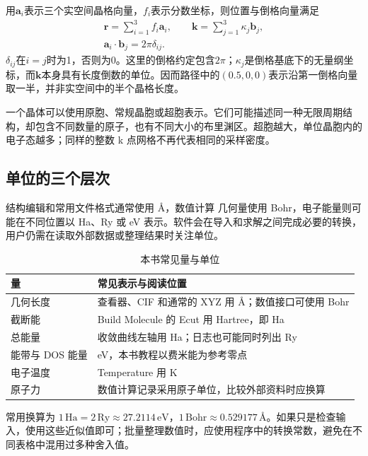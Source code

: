 用$\mathbf a_i$表示三个实空间晶格向量，$f_i$表示分数坐标，则位置与倒格向量满足
\begin{equation}
  \begin{gathered}
  \mathbf r=\sum_{i=1}^{3}f_i\mathbf a_i,
  \qquad \mathbf k=\sum_{j=1}^{3}\kappa_j\mathbf b_j,\\
  \mathbf a_i\!\cdot\!\mathbf b_j=2\pi\delta_{ij}.
  \end{gathered}
  \label{eq:reciprocal-convention}
\end{equation}
$\delta_{ij}$在$i=j$时为1，否则为0。这里的倒格约定包含$2\pi$；$\kappa_j$是倒格基底下的无量纲坐标，而$\mathbf k$本身具有长度倒数的单位。因而路径中的$(0.5,0,0)$表示沿第一倒格向量取一半，并非实空间中的半个晶格长度。

一个晶体可以使用原胞、常规晶胞或超胞表示。它们可能描述同一种无限周期结构，却包含不同数量的原子，也有不同大小的布里渊区。超胞越大，单位晶胞内的电子态越多；同样的整数 k 点网格不再代表相同的采样密度。

\subsection{单位的三个层次}

结构编辑和常用文件格式通常使用 Å，数值计算 几何量使用 Bohr，电子能量则可能在不同位置以 Ha、Ry 或 eV 表示。软件会在导入和求解之间完成必要的转换，用户仍需在读取外部数据或整理结果时关注单位。

\begin{table}[htbp]
\centering
\caption{本书常见量与单位}
\begin{tabularx}{\linewidth}{lX}
\toprule
量 & 常见表示与阅读位置\\
\midrule
几何长度 & 查看器、CIF 和通常的 XYZ 用 Å；数值接口可使用 Bohr\\
截断能 & Build Molecule 的 Ecut 用 Hartree，即 Ha\\
总能量 & 收敛曲线左轴用 Ha；日志也可能同时列出 Ry\\
能带与 DOS 能量 & eV，本书教程以费米能为参考零点\\
电子温度 & Temperature 用 K\\
原子力 & 数值计算记录采用原子单位，比较外部资料时应换算\\
\bottomrule
\end{tabularx}
\end{table}

常用换算为 $1\,\mathrm{Ha}=2\,\mathrm{Ry}\approx27.2114\,\mathrm{eV}$，$1\,\mathrm{Bohr}\approx0.529177\,\text{Å}$。如果只是检查输入，使用这些近似值即可；批量整理数值时，应使用程序中的转换常数，避免在不同表格中混用过多种舍入值。

